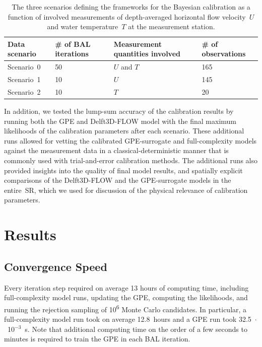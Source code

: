 \documentclass[draft,linenumbers,onecolumn]{agujournal2019} %
\begin{document}
\begin{table}
	\caption{The three scenarios defining the frameworks for the Bayesian calibration as a function of involved measurements of depth-averaged horizontal flow velocity~$U$ and water temperature~$T$ at the measurement station.}
	\label{tab:scenarios}
	\centering
	\begin{tabular}{P{2cm} P{4cm} P{3cm} P{2cm}} 
		\hline
		Data scenario & \# of BAL iterations & Measurement quantities involved & \# of observations \\
		\hline
		Scenario~0 & 50 & $U$ and $T$ & 165 \\ 
		Scenario~1 & 10 & $U$ & 145 \\ 
		Scenario~2 & 10 & $T$ & 20 \\ 
		\hline
	\end{tabular}
\end{table}

In addition, we tested the lump-sum accuracy of the calibration results by running both the GPE and Delft3D-FLOW model with the final maximum likelihoods of the calibration parameters after each scenario. These additional runs allowed for vetting the calibrated GPE-surrogate and full-complexity models against the measurement data in a classical-deterministic manner that is commonly used with trial-and-error calibration methods. The additional runs also provided insights into the quality of final model results, and spatially explicit comparisons of the Delft3D-FLOW and the GPE-surrogate models in the entire~SR, which we used for discussion of the physical relevance of calibration parameters.

\section{Results}

\subsection{Convergence Speed}
Every iteration step required on average 13 hours of computing time, including full-complexity model runs, updating the GPE, computing the likelihoods, and running the rejection sampling of 10\textsuperscript{6} Monte Carlo candidates. In particular, a full-complexity model run took on average 12.8~hours and a GPE run took 32.5~$\cdot$~10$^{-3}$~s. Note that additional computing time on the order of a few seconds to minutes is required to train the GPE in each BAL iteration.
\end{document}
